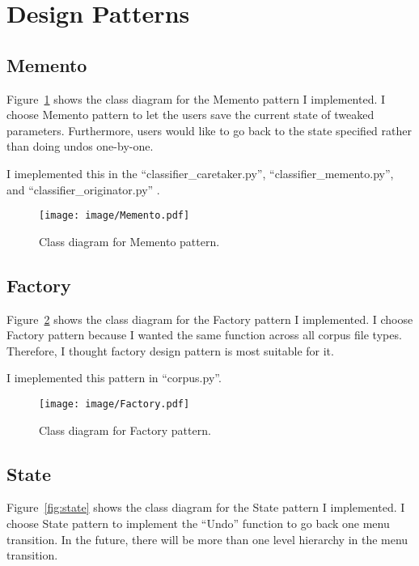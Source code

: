 \documentclass[11pt]{article}
\begin{document}
\section{Design Patterns}

\subsection{Memento}
Figure~\ref{fig:memento} shows the class diagram for the Memento pattern I implemented. 
I choose Memento pattern to let the users save the current state of tweaked parameters. 
Furthermore, users would like to go back to the state specified rather than doing undos one-by-one. 

I imeplemented this in the ``classifier\_caretaker.py'',  ``classifier\_memento.py'', and ``classifier\_originator.py'' . 

\begin{figure}[htb]
 \centering
     {\texttt{[image: image/Memento.pdf]}}
    \vspace{-2ex}
     \caption{\label{fig:memento}  
        Class diagram for Memento pattern.
     }
\end{figure}

\subsection{Factory}
Figure~\ref{fig:factory} shows the class diagram for the Factory pattern I implemented. 
I choose Factory pattern because I wanted the same function across all corpus file types. 
Therefore, I thought factory design pattern is most suitable for it. 

I imeplemented this pattern in ``corpus.py''.

\begin{figure}[htb]
 \centering
     {\texttt{[image: image/Factory.pdf]}}
    \vspace{-2ex}
     \caption{\label{fig:factory}  
        Class diagram for Factory pattern.
     }
\end{figure}

\subsection{State}
Figure~\ref{fig:state} shows the class diagram for the State pattern I implemented. 
I choose State pattern to implement the ``Undo'' function to go back one menu transition. 
In the future, there will be more than one level hierarchy in the menu transition. 
\end{document}
